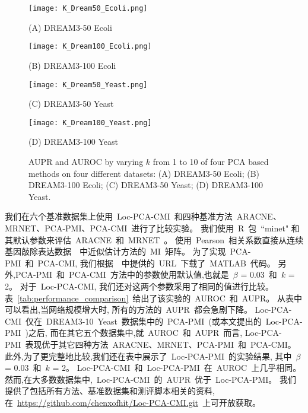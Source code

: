   \begin{figure*}[!htbp]
    \centering
    \begin{minipage}[b]{0.45\linewidth}
      \centering
      \centerline{
        \texttt{[image: K\_Dream50\_Ecoli.png]}}
      \centerline{(A) DREAM3-50 Ecoli}
      \medskip  
    \end{minipage}
    \begin{minipage}[b]{0.45\linewidth}
      \centering
      \centerline{
        \texttt{[image: K\_Dream100\_Ecoli.png]}}
      \centerline{(B) DREAM3-100 Ecoli}
      \medskip  
    \end{minipage}
      \begin{minipage}[b]{0.45\linewidth}
      \centering
      \centerline{
        \texttt{[image: K\_Dream50\_Yeast.png]}}
      \centerline{(C) DREAM3-50 Yeast}
      \medskip  
    \end{minipage}
    \begin{minipage}[b]{0.45\linewidth}
      \centering
      \centerline{
        \texttt{[image: K\_Dream100\_Yeast.png]}}
      \centerline{(D) DREAM3-100 Yeast}
      \medskip  
    \end{minipage}
    \caption{AUPR and AUROC  by varying $k$ from 1 to 10 of four PCA based methods on four different datasets: 
    (A) DREAM3-50 Ecoli; 
    (B) DREAM3-100 Ecoli; 
    (C) DREAM3-50 Yeast; 
    (D) DREAM3-100 Yeast.}
    \label{fig:k}
    \vspace{-0.5em}
  \end{figure*}

我们在六个基准数据集上使用~Loc-PCA-CMI~和四种基准方法~ARACNE、MRNET、PCA-PMI、PCA-CMI~进行了比较实验。
我们使用~R~包~``minet" 和其默认参数来评估~ARACNE~和~MRNET~\cite{meyer2008minet}。
使用~Pearson~相关系数直接从连续基因敲除表达数据~\cite{olsen2008impact,meyer2010information}~中近似估计方法的~MI~矩阵。
为了实现~PCA-PMI~和~PCA-CMI, 我们根据~\cite{zhang2011inferring,zhao2016part}~中提供的~URL~下载了~MATLAB~代码。
另外,PCA-PMI~和~PCA-CMI~方法中的参数使用默认值,也就是~$\beta$ = 0.03~和~$k$ = 2。
对于~Loc-PCA-CMI, 我们还对这两个参数采用了相同的值进行比较。
表~\ref{tab:performance_comparison}~给出了该实验的~AUROC~和~AUPR。
从表中可以看出,当网络规模增大时, 所有的方法的~AUPR~都会急剧下降。
Loc-PCA-CMI~仅在~DREAM3-10~Yeast~数据集中的~PCA-PMI~(或本文提出的~Loc-PCA-PMI~)之后,
而在其它五个数据集中,就~AUROC~和~AUPR~而言,
Loc-PCA-PMI~表现优于其它四种方法~ARACNE、MRNET、PCA-PMI~和~PCA-CMI。
此外,为了更完整地比较,我们还在表中展示了~Loc-PCA-PMI~的实验结果,
其中~$\beta$ = 0.03~和~$k$ = 2。
Loc-PCA-CMI~和~Loc-PCA-PMI~在~AUROC~上几乎相同。
然而,在大多数数据集中,~Loc-PCA-CMI~的~AUPR~优于~Loc-PCA-PMI。
我们提供了包括所有方法、基准数据集和测评脚本相关的资料, 
在~\url{https://github.com/chenxofhit/Loc-PCA-CMI.git}~上可开放获取。

